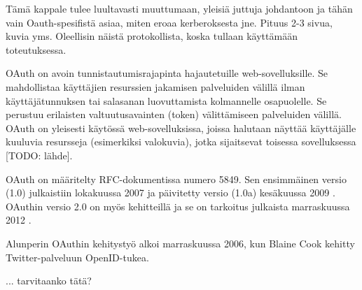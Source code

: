 Tämä kappale tulee luultavasti muuttumaan, yleisiä juttuja johdantoon ja tähän vain Oauth-spesifistä asiaa, miten eroaa kerberoksesta jne. Pituus 2-3 sivua, kuvia yms. Oleellisin näistä protokollista, koska tullaan käyttämään toteutuksessa.

OAuth on avoin tunnistautumisrajapinta hajautetuille web-sovelluksille. Se mahdollistaa käyttäjien resurssien jakamisen palveluiden välillä ilman käyttäjätunnuksen tai salasanan luovuttamista kolmannelle osapuolelle. Se perustuu erilaisten valtuutusavainten (token) välittämiseen palveluiden välillä. OAuth on yleisesti käytössä web-sovelluksissa, joissa halutaan näyttää käyttäjälle kuuluvia resursseja (esimerkiksi valokuvia), jotka sijaitsevat toisessa sovelluksessa [TODO: lähde].

OAuth on määritelty RFC-dokumentissa numero 5849. Sen ensimmäinen versio (1.0) julkaistiin lokakuussa 2007 ja päivitetty versio (1.0a) kesäkuussa 2009 \cite{oauth2_0}. OAuthin versio 2.0 on myös kehitteillä ja se on tarkoitus julkaista marraskuussa 2012 \cite{oauth2_0}.

Alunperin OAuthin kehitystyö alkoi marraskuussa 2006, kun Blaine Cook kehitty Twitter-palveluun OpenID-tukea.

... tarvitaanko tätä?